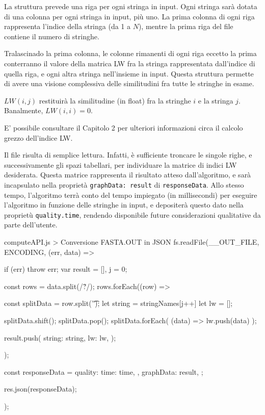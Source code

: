 La struttura prevede una riga per ogni stringa in input. Ogni stringa sarà dotata di una colonna per ogni stringa in input, più uno. La prima colonna di ogni riga rappresenta l'indice della stringa (da 1 a $N$), mentre la prima riga del file contiene il numero di stringhe.

Tralascinado la prima colonna, le colonne rimanenti di ogni riga eccetto la prima conterranno il valore della matrica LW fra la stringa rappresentata dall'indice di quella riga, e ogni altra stringa nell'insieme in input. Questa struttura permette di avere una visione complessiva delle similitudini fra tutte le stringhe in esame.

\vspace{3mm}

$LW(i, j)$ restituirà la similitudine (in float) fra la stringhe $i$ e la stringa $j$. Banalmente, $LW(i, i) = 0$.

\vspace{3mm}

E' possibile consultare il Capitolo 2 per ulteriori informazioni circa il calcolo grezzo dell'indice LW.

\vspace{3mm}

Il file risulta di semplice lettura. Infatti, è sufficiente troncare le singole righe, e successivamente gli spazi tabellari, per individuare la matrice di indici LW desiderata. Questa matrice rappresenta il risultato atteso dall'algoritmo, e sarà incapsulato nella proprietà \verb|graphData: result| di \verb|responseData|. Allo stesso tempo, l'algoritmo terrà conto del tempo impiegato (in millisecondi) per eseguire l'algoritmo in funzione delle stringhe in input, e depositerà questo dato nella proprietù \verb|quality.time|, rendendo disponibile future considerazioni qualitative da parte dell'utente.

\begin{sexylisting}{computeAPI.js > Conversione FASTA.OUT in JSON}
fs.readFile(__OUT_FILE, ENCODING, (err, data) => {
	if (err) throw err;
	var result = [], j = 0;

	const rows = data.split(/\r?\n/);
	rows.forEach((row) => {
		const splitData = row.split('\t');
		let string = stringNames[j++]
		let lw = [];

		splitData.shift();
		splitData.pop();
		splitData.forEach(
		    (data) => lw.push(data)
		);

		result.push({
			string: string,
			lw: lw,
		});
	});

	const responseData = {
		quality: {
			time: time,
		},
		graphData: result,
	};

	res.json(responseData);
});
\end{sexylisting}

